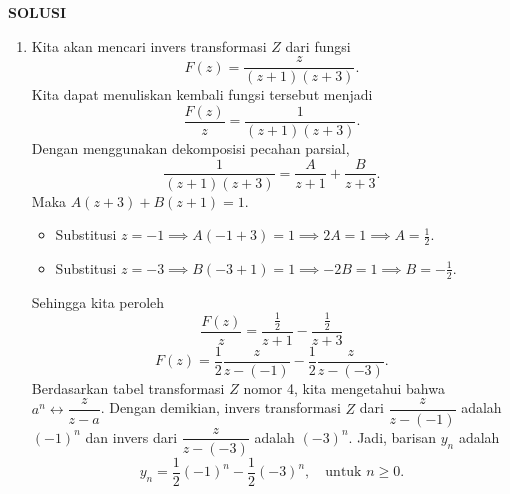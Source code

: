 \documentclass[12pt,openany,a4paper]{article}
\begin{document}
\newpage
\textbf{SOLUSI}
\begin{enumerate}
  \item Kita akan mencari invers transformasi $Z$ dari fungsi
        \[F(z) = \frac{z}{(z+1)(z+3)}.\]
        Kita dapat menuliskan kembali fungsi tersebut menjadi
        \[\frac{F(z)}{z} = \frac{1}{(z+1)(z+3)}.\]
        Dengan menggunakan dekomposisi pecahan parsial,
        \[\frac{1}{(z+1)(z+3)} = \frac{A}{z+1} + \frac{B}{z+3}.\]
        Maka $A(z+3) + B(z+1) = 1$.
        \begin{itemize}
          \item Substitusi $z = -1 \implies A(-1+3) = 1 \implies 2A = 1 \implies A = \frac{1}{2}$.
          \item Substitusi $z = -3 \implies B(-3+1) = 1 \implies -2B = 1 \implies B = -\frac{1}{2}$.
        \end{itemize}
        Sehingga kita peroleh
        \[\frac{F(z)}{z} = \frac{\frac{1}{2}}{z+1} - \frac{\frac{1}{2}}{z+3}\]
        \[F(z) = \frac{1}{2}\frac{z}{z-(-1)} - \frac{1}{2}\frac{z}{z-(-3)}.\]
        Berdasarkan tabel transformasi $Z$ nomor 4, kita mengetahui bahwa $a^n \leftrightarrow \dfrac{z}{z-a}$.
        Dengan demikian, invers transformasi $Z$ dari $\dfrac{z}{z-(-1)}$ adalah $(-1)^n$ dan invers dari $\dfrac{z}{z-(-3)}$ adalah $(-3)^n$.
        Jadi, barisan $y_n$ adalah
        \[y_n = \frac{1}{2}(-1)^n - \frac{1}{2}(-3)^n, \quad \text{untuk } n \ge 0.\]


\end{enumerate}
\end{document}
